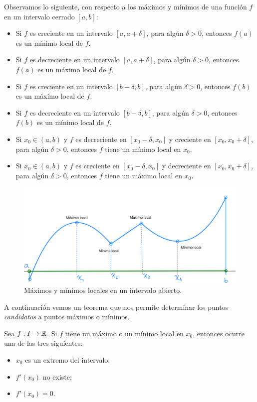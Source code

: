 Observamos lo siguiente, con respecto a los máximos y mínimos de una función $f$ en un intervalo cerrado $[a,b]$:
\begin{itemize}
    \item Si $f$ es creciente en un intervalo $[a,a+\delta]$, para algún $\delta>0$, entonces $f(a)$ es un mínimo local de $f$.
    \item Si $f$ es decreciente en un intervalo $[a,a+\delta]$, para algún $\delta>0$, entonces $f(a)$ es un máximo local de $f$.
    \item Si $f$ es creciente en un intervalo $[b-\delta,b]$, para algún $\delta>0$, entonces $f(b)$ es un máximo local de $f$.
    \item Si $f$ es decreciente en un intervalo $[b-\delta,b]$, para algún $\delta>0$, entonces $f(b)$ es un mínimo local de $f$.
    \item Si $x_0\in(a,b)$ y $f$ es decreciente en $[x_0-\delta,x_0]$ y creciente en $[x_0,x_0+\delta]$, para algún $\delta>0$, entonces $f$ tiene un mínimo local en $x_0$.
    \item Si $x_0\in(a,b)$ y $f$ es creciente en $[x_0-\delta,x_0]$ y decreciente en $[x_0,x_0+\delta]$, para algún $\delta>0$, entonces $f$ tiene un máximo local en $x_0$.
\end{itemize}

\begin{figure}[htbp]
    \centerline{\includegraphics[width=.8\textwidth]{pics/max-min-locales-int-abierto.png}}
\caption{Máximos y mínimos locales en un intervalo abierto.}
\end{figure}


A continuación vemos un teorema que nos permite determinar los puntos \emph{candidatos} a puntos máximos o mínimos.

\begin{theorem}
    Sea $f:I\to\mathbb{R}$. Si $f$ tiene un máximo o un mínimo local en $x_0$, entonces ocurre una de las tres siguientes:
    \begin{itemize}
        \item $x_0$ es un extremo del intervalo;
        \item $f'(x_0)$ no existe;
        \item $f'(x_0)=0$.
    \end{itemize}
\end{theorem}

